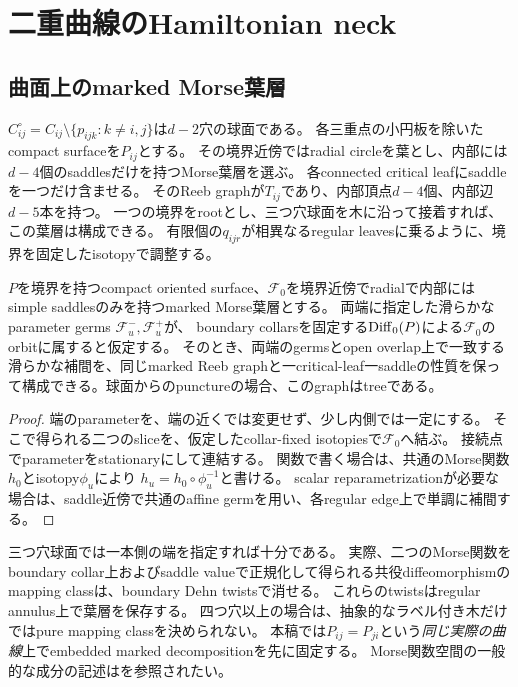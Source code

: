 \section{二重曲線のHamiltonian neck}\label{sec:necks}

\subsection{曲面上のmarked Morse葉層}
$C_{ij}^{\circ}=C_{ij}\setminus\{p_{ijk}:k\ne i,j\}$は$d-2$穴の球面である。
各三重点の小円板を除いたcompact surfaceを$P_{ij}$とする。
その境界近傍ではradial circleを葉とし、内部には$d-4$個のsaddlesだけを持つMorse葉層を選ぶ。
各connected critical leafにsaddleを一つだけ含ませる。
そのReeb graphが$T_{ij}$であり、内部頂点$d-4$個、内部辺$d-5$本を持つ。
一つの境界をrootとし、三つ穴球面を木に沿って接着すれば、この葉層は構成できる。
有限個の$q_{ijr}$が相異なるregular leavesに乗るように、境界を固定したisotopyで調整する。

\begin{lemma}\label{neck:marked-interpolation}
$P$を境界を持つcompact oriented surface、$\mathcal F_0$を境界近傍でradialで内部にはsimple saddlesのみを持つmarked Morse葉層とする。
両端に指定した滑らかなparameter germs $\mathcal F^-_u,\mathcal F^+_u$が、
boundary collarsを固定する$\operatorname{Diff}_0(P)$による$\mathcal F_0$のorbitに属すると仮定する。
そのとき、両端のgermsとopen overlap上で一致する滑らかな補間を、同じmarked Reeb graphと一critical-leaf一saddleの性質を保って構成できる。球面からのpunctureの場合、このgraphはtreeである。
\end{lemma}
\begin{proof}
端のparameterを、端の近くでは変更せず、少し内側では一定にする。
そこで得られる二つのsliceを、仮定したcollar-fixed isotopiesで$\mathcal F_0$へ結ぶ。
接続点でparameterをstationaryにして連結する。
関数で書く場合は、共通のMorse関数$h_0$とisotopy$\phi_u$により
$h_u=h_0\circ\phi_u^{-1}$と書ける。
scalar reparametrizationが必要な場合は、saddle近傍で共通のaffine germを用い、各regular edge上で単調に補間する。
\end{proof}

三つ穴球面では一本側の端を指定すれば十分である。
実際、二つのMorse関数をboundary collar上およびsaddle valueで正規化して得られる共役diffeomorphismのmapping classは、boundary Dehn twistsで消せる。
これらのtwistsはregular annulus上で葉層を保存する。
四つ穴以上の場合は、抽象的なラベル付き木だけではpure mapping classを決められない。
本稿では$P_{ij}=P_{ji}$という\emph{同じ実際の曲線}上でembedded marked decompositionを先に固定する。
Morse関数空間の一般的な成分の記述は\cite{Maksymenko}を参照されたい。


